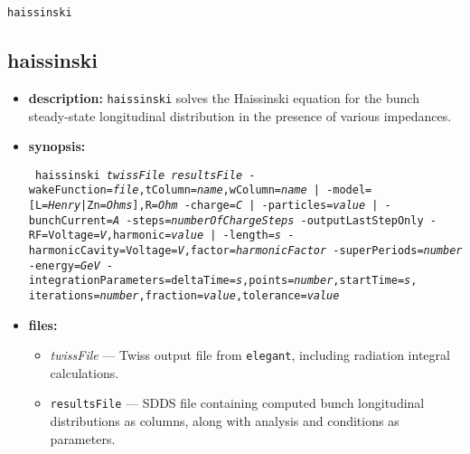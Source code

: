 \documentclass[11pt]{article}
\begin{document}
\newpage
\begin{center}{\Large\verb|haissinski|}\end{center}
\subsection{haissinski}

\begin{itemize}
\item {\bf description:}  {\tt haissinski} solves the Haissinski equation for the bunch
 steady-state longitudinal distribution in the presence of various impedances.

\item {\bf synopsis:}
\begin{flushleft}{\tt
haissinski {\em twissFile} {\em resultsFile}
 {-wakeFunction={\em file},tColumn={\em name},wColumn={\em name} |
  -model=[L={\em Henry}|Zn={\em Ohms}],R={\em Ohm}} 
 {-charge={\em C} | -particles={\em value} | -bunchCurrent={\em A}}
 {-steps={\em numberOfChargeSteps}}
 {-outputLastStepOnly}
 {-RF=Voltage={\em V},harmonic={\em value} | -length={\em s}}
 {-harmonicCavity=Voltage={\em V},factor={\em harmonicFactor}}
 {-superPeriods={\em number}}
 {-energy={\em GeV}} 
 -integrationParameters=deltaTime={\em s},points={\em number},startTime={\em s},
iterations={\em number},fraction={\em value},tolerance={\em value} 
}\end{flushleft}

\item {\bf files:}
\begin{itemize}
\item {\em twissFile} --- Twiss output file from {\tt elegant}, including radiation
 integral calculations.
\item {\tt resultsFile} --- SDDS file containing computed bunch longitudinal distributions
 as columns, along with analysis and conditions as parameters.
\end{itemize}


\end{itemize}
\end{document}

